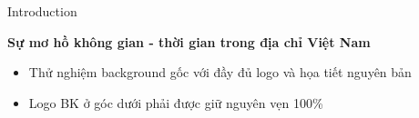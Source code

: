 \documentclass[aspectratio=169,10pt]{beamer}
\begin{document}
\begin{frame}{Introduction}
\vspace{0.2cm}
\centerline{\large\textbf{Sự mơ hồ không gian - thời gian trong địa chỉ Việt Nam}}
\vspace{0.4cm}
\begin{itemize}
  \item Thử nghiệm background gốc với đầy đủ logo và họa tiết nguyên bản
  \item Logo BK ở góc dưới phải được giữ nguyên vẹn 100\%
\end{itemize}
\end{frame}
\end{document}
